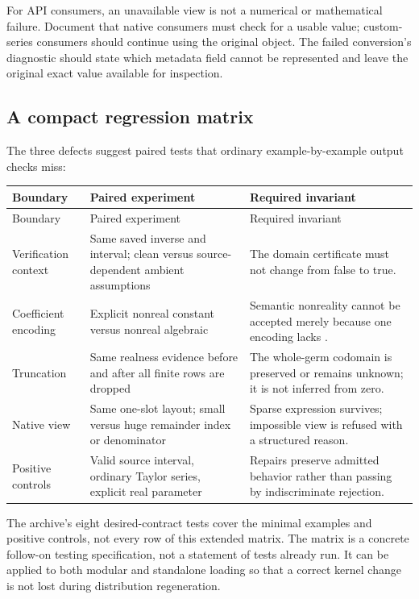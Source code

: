 \documentclass[11pt,a4paper]{article}
\newcommand{\code}[1]{\texttt{\detokenize{#1}}}
\begin{document}
For API consumers, an unavailable view is not a numerical or mathematical failure. Document that native consumers must check for a usable \code{SeriesData} value; custom-series consumers should continue using the original object. The failed conversion's diagnostic should state which metadata field cannot be represented and leave the original exact value available for inspection.

\subsection{A compact regression matrix}
The three defects suggest paired tests that ordinary example-by-example output checks miss:
\begin{longtable}{@{}P{0.20\textwidth}P{0.34\textwidth}P{0.38\textwidth}@{}}
\toprule Boundary & Paired experiment & Required invariant\\\midrule\endfirsthead
\toprule Boundary & Paired experiment & Required invariant\\\midrule\endhead
Verification context & Same saved inverse and interval; clean versus source-dependent ambient assumptions & The domain certificate must not change from false to true.\\
Coefficient encoding & Explicit nonreal constant versus nonreal algebraic \code{Root} & Semantic nonreality cannot be accepted merely because one encoding lacks \code{Complex}.\\
Truncation & Same realness evidence before and after all finite rows are dropped & The whole-germ codomain is preserved or remains unknown; it is not inferred from zero.\\
Native view & Same one-slot layout; small versus huge remainder index or denominator & Sparse expression survives; impossible view is refused with a structured reason.\\
Positive controls & Valid source interval, ordinary Taylor series, explicit real parameter & Repairs preserve admitted behavior rather than passing by indiscriminate rejection.\\
\bottomrule
\end{longtable}

The archive's eight desired-contract tests cover the minimal examples and positive controls, not every row of this extended matrix. The matrix is a concrete follow-on testing specification, not a statement of tests already run. It can be applied to both modular and standalone loading so that a correct kernel change is not lost during distribution regeneration.
\end{document}
